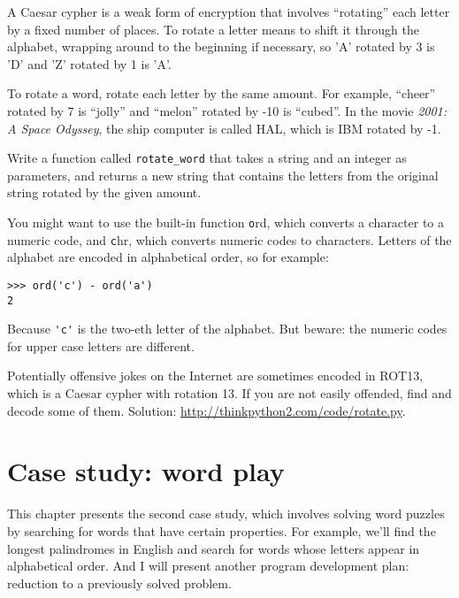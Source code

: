 \documentclass[
DIV=11,
fontsize=13,
twoside,
headinclude=false,
titlepage=firstiscover,
abstract=true,
headsepline=true,
footsepline=true,
chapterprefix=true, %
headings=big,
bibliography=totoc,%
captions=tableheading
]{scrbook}
\theoremstyle{definition}
\begin{document}
\begin{exercise}
\normalfont
{}

\label{exrotate}
A Caesar cypher is a weak form of encryption that involves ``rotating'' each
letter by a fixed number of places.  To rotate a letter means
to shift it through the alphabet, wrapping around to the beginning if
necessary, so 'A' rotated by 3 is 'D' and 'Z' rotated by 1 is 'A'.

To rotate a word, rotate each letter by the same amount.
For example, ``cheer'' rotated by 7 is ``jolly'' and ``melon'' rotated
by -10 is ``cubed''.  In the movie {\em 2001: A Space Odyssey}, the 
ship computer is called HAL, which is IBM rotated by -1.


Write a function called \verb"rotate_word"
that takes a string and an integer as parameters, and returns
a new string that contains the letters from the original string
rotated by the given amount.  

You might want to use the built-in function {\texttt ord}, which converts
a character to a numeric code, and {\texttt chr}, which converts numeric
codes to characters.  Letters of the alphabet are encoded in alphabetical
order, so for example:

\begin{lstlisting}
>>> ord('c') - ord('a')
2
\end{lstlisting}

Because \verb"'c'" is the two-eth letter of the alphabet.  But
beware: the numeric codes for upper case letters are different.

Potentially offensive jokes on the Internet are sometimes encoded in
ROT13, which is a Caesar cypher with rotation 13.  If you are not
easily offended, find and decode some of them.  Solution:
\url{http://thinkpython2.com/code/rotate.py}.

\end{exercise}


\chapter{Case study: word play}
\label{wordplay}

This chapter presents the second case study, which involves
solving word puzzles by searching for words that have certain
properties.  For example, we'll find the longest palindromes
in English and search for words whose letters appear in
alphabetical order.  And I will present another program development
plan: reduction to a previously solved problem.
\end{document}
